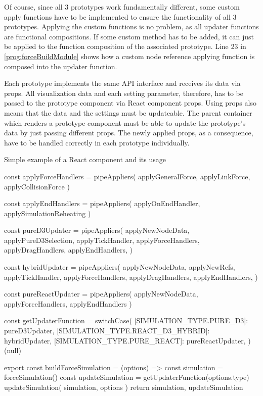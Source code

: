 Of course, since all 3 prototypes work fundamentally different, some custom apply functions have to be implemented to ensure the functionality of all 3 prototypes. Applying the custom functions is no problem, as all updater functions are functional compositions. If some custom method has to be added, it can just be applied to the function composition of the associated prototype. Line 23 in \ref{prog:forceBuildModule} shows how a custom node reference applying function is composed into the updater function.

Each prototype implements the same API interface and receives its data via props. All visualization data and each setting parameter, therefore, has to be passed to the prototype component via React component props. Using props also means that the data and the settings must be updateable. The parent container which renders a prototype component must be able to update the prototype's data by just passing different props. The newly applied props, as a consequence, have to be handled correctly in each prototype individually.

\begin{program}[H]
\caption{Simple example of a React component and its usage} 
\label{prog:forceBuildModule}
\begin{JsCode}
const applyForceHandlers = pipeAppliers(
  applyGeneralForce, 
  applyLinkForce, 
  applyCollisionForce
)

const applyEndHandlers = pipeAppliers(
  applyOnEndHandler, 
  applySimulationReheating
)

const pureD3Updater = pipeAppliers(
  applyNewNodeData,
  applyPureD3Selection,
  applyTickHandler,
  applyForceHandlers,
  applyDragHandlers,
  applyEndHandlers,
)

const hybridUpdater = pipeAppliers(
  applyNewNodeData,
  applyNewRefs,
  applyTickHandler,
  applyForceHandlers,
  applyDragHandlers,
  applyEndHandlers,
)

const pureReactUpdater = pipeAppliers(
  applyNewNodeData, 
  applyForceHandlers, 
  applyEndHandlers
)

const getUpdaterFunction = switchCase({
  [SIMULATION_TYPE.PURE_D3]: pureD3Updater,
  [SIMULATION_TYPE.REACT_D3_HYBRID]: hybridUpdater,
  [SIMULATION_TYPE.PURE_REACT]: pureReactUpdater,
})(null)

export const buildForceSimulation = (options) => {
  const simulation = forceSimulation()
  const updateSimulation = getUpdaterFunction(options.type)
  updateSimulation({ simulation, options })
  return { simulation, updateSimulation }
}
\end{JsCode}
\end{program}

